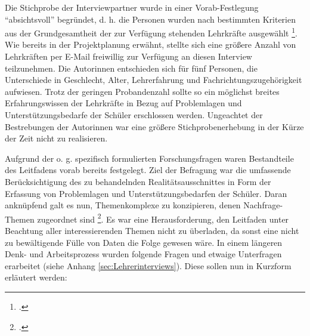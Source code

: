 Die Stichprobe der Interviewpartner wurde in einer Vorab-Festlegung "`absichtsvoll"' begründet, d. h. die Personen wurden nach bestimmten Kriterien aus der Grundgesamtheit der zur Verfügung stehenden Lehrkräfte ausgewählt \footcite[vgl.][39]{Mayer2013}. Wie bereits in der Projektplanung erwähnt, stellte sich eine größere Anzahl von Lehrkräften per E-Mail freiwillig zur Verfügung an diesen Interview teilzunehmen. Die Autorinnen entschieden sich für fünf Personen, die Unterschiede in Geschlecht, Alter, Lehrerfahrung und Fachrichtungszugehörigkeit aufwiesen. Trotz der geringen Probandenzahl sollte so ein möglichst breites Erfahrungswissen der Lehrkräfte in Bezug auf Problemlagen und Unterstützungsbedarfe der Schüler erschlossen werden. Ungeachtet der Bestrebungen der Autorinnen war eine größere Stichprobenerhebung in der Kürze der Zeit nicht zu realisieren.

Aufgrund der o. g. spezifisch formulierten Forschungsfragen waren Bestandteile des Leitfadens vorab bereits festgelegt. Ziel der Befragung war die umfassende Berücksichtigung des zu behandelnden Realitätsausschnittes in Form der Erfassung von Problemlagen und Unterstützungsbedarfen der Schüler. Daran anknüpfend galt es nun, Themenkomplexe zu konzipieren, denen Nachfrage-Themen zugeordnet sind \footcite[vgl.][45]{Mayer2013}. Es war eine Herausforderung, den Leitfaden unter Beachtung aller interessierenden Themen nicht zu überladen, da sonst eine nicht zu bewältigende Fülle von Daten die Folge gewesen wäre. In einem längeren Denk- und Arbeitsprozess wurden folgende Fragen und etwaige Unterfragen erarbeitet (siehe Anhang \ref{sec:Lehrerinterviews}). Diese sollen nun in Kurzform erläutert werden:


